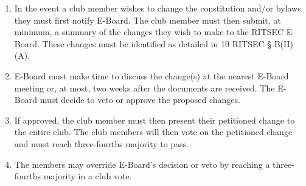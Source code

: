 \begin{enumerate}
  \item In the event a club member wishes to change the constitution and/or
    bylaws they must first notify E-Board. The club member must then submit, at
    minimum, a summary of the changes they wish to make to the RITSEC E-Board.
    These changes must be identified as detailed in 10 RITSEC § B(II)(A).
  \item E-Board must make time to discuss the change(s) at the nearest E-Board
    meeting or, at most, two weeks after the documents are received. The
    E-Board must decide to veto or approve the proposed changes.
  \item If approved, the club member must then present their petitioned change
    to the entire club. The club members will then vote on the petitioned
    change and must reach three-fourths majority to pass.
  \item The members may override E-Board's decision or veto by reaching a
    three-fourths majority in a club vote.
\end{enumerate}